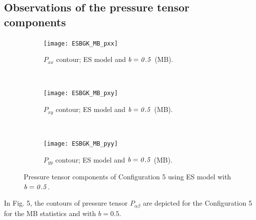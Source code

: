 \documentclass{rsproca}%
\begin{document}
\subsection{Observations of the pressure tensor components}

\begin{figure}
        \centering
        \begin{subfigure}[b]{0.32\textwidth}
                \centering
                \texttt{[image: ESBGK\_MB\_pxx]}
                \caption{$P_{xx}$ contour; ES model and $\it{b=0.5}$ (MB).}
                \label{fig:5ESBGK_MB_pxx}
        \end{subfigure}%
        ~ %
        \begin{subfigure}[b]{0.32\textwidth}
                \centering
                \texttt{[image: ESBGK\_MB\_pxy]}
                \caption{$P_{xy}$ contour; ES model and $\it{b=0.5}$ (MB).}
                \label{fig:5ESBGK_MB_pxy}
        \end{subfigure}
        ~ %
        \begin{subfigure}[b]{0.32\textwidth}
                \centering
                \texttt{[image: ESBGK\_MB\_pyy]}
                \caption{$P_{yy}$ contour; ES model and $\it{b=0.5}$ (MB).}
                \label{fig:5ESBGK_MB_pyy}
        \end{subfigure}
        \caption{Pressure tensor components of Configuration 5 using ES model with $\it{b=0.5}$.}\label{fig:conf5_pTensor_MB}
\end{figure}
In Fig. 5, the contours of pressure tensor $P_{\alpha \beta}$ are depicted for the Configuration 5 for the MB statistics and with $b=0.5$.
\end{document}
